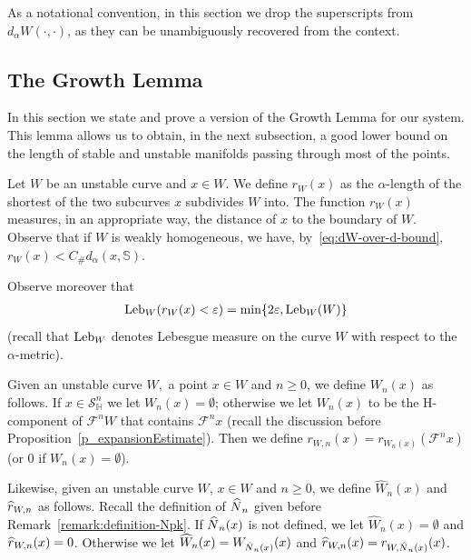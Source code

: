 \documentclass[AHL, Unicode, longabstracts,published]{cedram}
\newcommand{\eps}{\varepsilon}
\newcommand{\const}{C_\#}
\newcommand{\hhs}{\mathbb{S}}
\newcommand{\homo}{\mathbb{H}}
\newcommand{\cm}{\mathcal{F}}
\newcommand{\dadm}[1]{\dadmPrivate^{#1}}
\newcommand{\dadmPrivate}{d\adm}
\newcommand{\singPrivate}{\mathcal{S}}
\newcommand{\hsing}[1]{{\singPrivate}_\homo^{#1}}
\newcommand{\adm}{_{\alpha^{+}}}
\newcommand{\admName}{\alpha^{+}}
\newcommand{\Np}{\hat N}
\newcommand{\Leb}{\textup{Leb}}
\renewcommand{\admName}{\alpha}
\renewcommand{\adm}{_{\alpha}}
\renewcommand{\dadm}{d\adm}
\let\oldhat\hat
\renewcommand*{\hat}[1]{\mathchoice{\widehat{#1}}{\widehat{#1}}{\oldhat{#1}}{\oldhat{#1}}}
\begin{document}
As a notational convention, in this section we drop the superscripts from $\dadm{W}(\cdot,\cdot)$, as they can be unambiguously recovered from the context.


\subsection{The Growth Lemma}\label{sec:growth-lemma}
In this section we state and prove a version of the Growth Lemma for our system. This lemma allows us to obtain, in the next subsection, a good lower bound on the length of stable and unstable manifolds passing through most of the points.

Let $W$ be an unstable curve and $x\in W$. We define $r_W(x)$ as the $\admName$-length of the shortest of the two subcurves $x$ subdivides $W$ into. The function $r_{W}(x)$ measures, in an appropriate way, the distance of $x$ to the boundary of $W$. Observe that if $W$ is weakly homogeneous, we have, by~\eqref{eq:dW-over-d-bound},\; $r_{W}(x) < \const \dadm(x,\hhs)$.

Observe moreover that
\begin{align}\label{eq:trivial-bound-for-r}
\Leb_{W}(r_{W}(x) < \eps) = \min\{2\eps,\Leb_{W}(W)\}
\end{align}
(recall that $\Leb_{W}$ denotes Lebesgue measure on the curve $W$ with respect to the $\admName$-metric).

Given an unstable curve $W,$ a point $x\in W$ and $n\ge 0$, we define $W_{n}(x)$ as follows. If $x\in\hsing n$ we let $W_{n}(x) = \emptyset$; otherwise we let $W_{n}(x)$ to be the H-component of $\cm^{n} W$ that contains $\cm^{n} x$ (recall the discussion before Proposition~\ref{p_expansionEstimate}). Then we define $r_{W,n}(x) = r_{W_{n}(x)}(\cm^{n}x)$ (or $0$ if $W_{n}(x) = \emptyset$).

Likewise, given an unstable curve $W$, $x\in W$ and $n\ge 0$, we define $\widehat{W}_{n}(x)$ and $\hat r_{W,n}$ as follows. Recall the definition of $\Np_{n}$ given before Remark~\ref{remark:definition-Npk}. If $\Np_{n}(x)$ is not defined, we let $\widehat{W}_{n}(x) = \emptyset$ and $\hat r_{W,n}(x) = 0$. Otherwise we let $\widehat{W}_{n}(x) = W_{\Np_{n}(x)}(x)$ and $\hat r_{W,n}(x) = r_{W,\Np_{n}(x)}(x)$.
\end{document}
